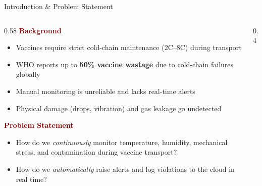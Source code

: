\documentclass[aspectratio=169, 10pt]{beamer}
\begin{document}
\begin{frame}[shrink=5]{Introduction \& Problem Statement}
  \begin{columns}[T]
    \begin{column}{0.58\textwidth}
      \textbf{\textcolor{darkred}{Background}}
      \begin{itemize}\setlength\itemsep{0.25em}
        \item Vaccines require strict cold-chain maintenance (2\textdegree C--8\textdegree C) during transport
        \item WHO reports up to \textbf{50\% vaccine wastage} due to cold-chain failures globally
        \item Manual monitoring is unreliable and lacks real-time alerts
        \item Physical damage (drops, vibration) and gas leakage go undetected
      \end{itemize}
      \vspace{0.35em}
      \textbf{\textcolor{darkred}{Problem Statement}}
      \begin{itemize}\setlength\itemsep{0.25em}
        \item How do we \textit{continuously} monitor temperature, humidity, mechanical stress, and contamination during vaccine transport?
        \item How do we \textit{automatically} raise alerts and log violations to the cloud in real time?
      \end{itemize}
    \end{column}
    \begin{column}{0.4\textwidth}
    \end{column}
  \end{columns}
\end{frame}
\end{document}
